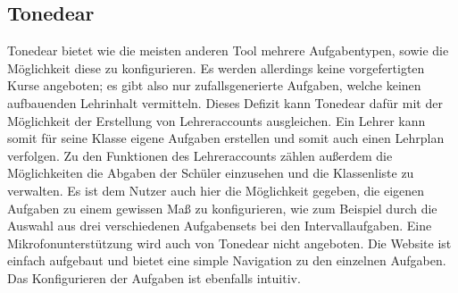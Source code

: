 \subsection*{Tonedear}
\label{sec:Tonedear}
Tonedear bietet wie die meisten anderen Tool mehrere Aufgabentypen, sowie die Möglichkeit diese zu konfigurieren. Es werden allerdings keine vorgefertigten Kurse angeboten; es gibt also nur zufallsgenerierte Aufgaben, welche keinen aufbauenden Lehrinhalt vermitteln. Dieses Defizit kann Tonedear dafür mit der Möglichkeit der Erstellung von Lehreraccounts ausgleichen. Ein Lehrer kann somit für seine Klasse eigene Aufgaben erstellen und somit auch einen Lehrplan verfolgen. Zu den Funktionen des Lehreraccounts zählen außerdem die Möglichkeiten die Abgaben der Schüler einzusehen und die Klassenliste zu verwalten. Es ist dem Nutzer auch hier die Möglichkeit gegeben, die eigenen Aufgaben
zu einem gewissen Maß zu konfigurieren, wie zum Beispiel durch die Auswahl aus drei verschiedenen Aufgabensets bei den Intervallaufgaben. Eine Mikrofonunterstützung wird auch von Tonedear nicht angeboten. Die Website ist einfach aufgebaut und bietet eine simple Navigation zu den einzelnen Aufgaben. 
Das Konfigurieren der Aufgaben ist ebenfalls intuitiv. \cite{tonedear}


